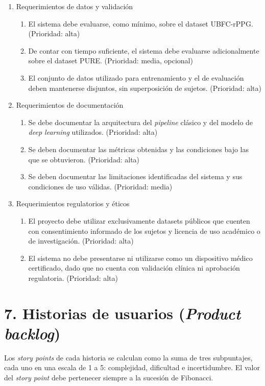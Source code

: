 \documentclass[
11pt, %
]{charter}
\begin{document}
\begin{enumerate}
\begin{enumerate}
		\end{enumerate}
		\item Requerimientos de datos y validación
		\begin{enumerate}
			\item El sistema debe evaluarse, como mínimo, sobre el dataset UBFC-rPPG. (Prioridad: alta)
			\item De contar con tiempo suficiente, el sistema debe evaluarse adicionalmente sobre el dataset PURE. (Prioridad: media, opcional)
			\item El conjunto de datos utilizado para entrenamiento y el de evaluación deben mantenerse disjuntos, sin superposición de sujetos. (Prioridad: alta)
		\end{enumerate}
		\item Requerimientos de documentación
		\begin{enumerate}
			\item Se debe documentar la arquitectura del \textit{pipeline} clásico y del modelo de \textit{deep learning} utilizados. (Prioridad: alta)
			\item Se deben documentar las métricas obtenidas y las condiciones bajo las que se obtuvieron. (Prioridad: alta)
			\item Se deben documentar las limitaciones identificadas del sistema y sus condiciones de uso válidas. (Prioridad: media)
		\end{enumerate}
		\item Requerimientos regulatorios y éticos
		\begin{enumerate}
			\item El proyecto debe utilizar exclusivamente datasets públicos que cuenten con consentimiento informado de los sujetos y licencia de uso académico o de investigación. (Prioridad: alta)
			\item El sistema no debe presentarse ni utilizarse como un dispositivo médico certificado, dado que no cuenta con validación clínica ni aprobación regulatoria. (Prioridad: alta)
		\end{enumerate}
	\end{enumerate}
	
	\section{7. Historias de usuarios (\textit{Product backlog})}
	\label{sec:backlog}
	
Los \textit{story points} de cada historia se calculan como la suma de tres subpuntajes, cada uno en una escala de 1 a 5: complejidad, dificultad e incertidumbre. El valor del \textit{story point} debe pertenecer siempre a la sucesión de Fibonacci.
\end{document}
